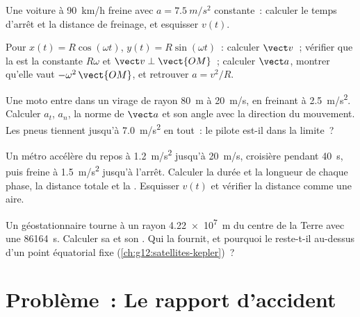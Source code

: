 \begin{exercise}[$\star\star$]\label{exo:g12:kinematics-2d:11}
Une voiture à \qty{90}{km/h} freine avec $a = \qty{7.5}{m/s^2}$
constante~: calculer le temps d'arrêt et la distance de freinage, et
esquisser $v(t)$.
\end{exercise}

\begin{exercise}[$\star\star\star$]\label{exo:g12:kinematics-2d:12}
Pour $x(t) = R\cos(\omega t)$, $y(t) = R\sin(\omega t)$~: calculer
$\vect v$~; vérifier que la  est la constante
$R\omega$ et $\vect v \perp \vect{OM}$~; calculer $\vect a$, montrer
qu'elle vaut $-\omega^2\,\vect{OM}$, et retrouver $a = v^2/R$.
\end{exercise}

\begin{exercise}[$\star\star\star$]\label{exo:g12:kinematics-2d:13}
Une moto entre dans un virage de rayon \qty{80}{m} à \qty{20}{m/s}, en
freinant à \qty{2.5}{m/s^2}. Calculer $a_t$, $a_n$, la norme de
$\vect a$ et son angle avec la direction du mouvement. Les pneus
tiennent jusqu'à \qty{7.0}{m/s^2} en tout~: le pilote est-il dans la
limite~?
\end{exercise}

\begin{exercise}[$\star\star\star$]\label{exo:g12:kinematics-2d:14}
Un métro accélère du repos à \qty{1.2}{m/s^2} jusqu'à \qty{20}{m/s},
croisière pendant \qty{40}{s}, puis freine à \qty{1.5}{m/s^2} jusqu'à
l'arrêt. Calculer la durée et la longueur de chaque phase, la distance
totale et la . Esquisser $v(t)$ et vérifier la
distance comme une aire.
\end{exercise}

\begin{exercise}[$\star\star\star$]\label{exo:g12:kinematics-2d:15}
Un  géostationnaire tourne à un rayon
\qty{4.22e7}{m} du centre de la Terre avec une 
\qty{86164}{s}. Calculer sa  et son
. Qui la fournit, et pourquoi le
 reste-t-il au-dessus d'un point équatorial fixe
(\cref{ch:g12:satellites-kepler})~?
\end{exercise}

\section{Problème~: Le rapport d'accident}

